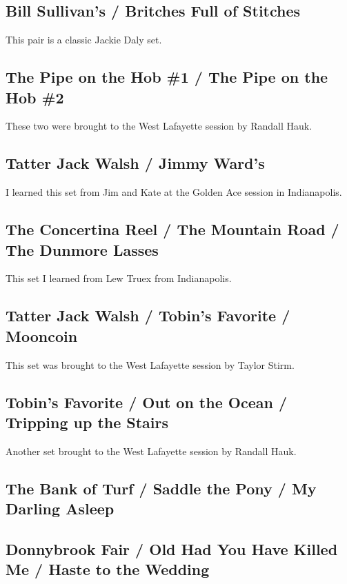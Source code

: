 \documentclass[11pt,letterpaper]{article}
\begin{document}
\subsection*{Bill Sullivan's / Britches Full of Stitches} 

This pair is a classic Jackie Daly set.

\subsection*{The Pipe on the Hob \#1 / The Pipe on the Hob \#2} 

These two were brought to the West Lafayette session by Randall Hauk.

\subsection*{Tatter Jack Walsh / Jimmy Ward's} 

I learned this set from Jim and Kate at the Golden Ace session in Indianapolis.

\subsection*{The Concertina Reel / The Mountain Road / The Dunmore Lasses} 

This set I learned from Lew Truex from Indianapolis.

\subsection*{Tatter Jack Walsh / Tobin's Favorite / Mooncoin} 

This set was brought to the West Lafayette session by Taylor Stirm.

\subsection*{Tobin's Favorite / Out on the Ocean / Tripping up the Stairs} 

Another set brought to the West Lafayette session by Randall Hauk.

\subsection*{The Bank of Turf / Saddle the Pony / My Darling Asleep} 
\subsection*{Donnybrook Fair / Old Had You Have Killed Me / Haste to the Wedding} 
\end{document}
